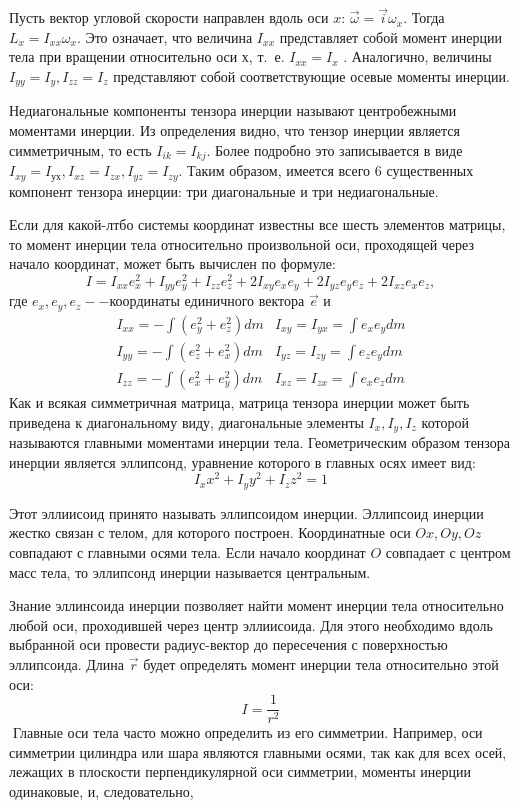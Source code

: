 \documentclass[12pt,a5paper,fleqn]{article}
\begin{document}
Пусть вектор угловой скорости направлен вдоль оси $x$: $\vec{\omega} = \vec{i} \omega_x$. Тогда $L_x = I_{xx}\omega_x$. Это означает, что величина $I_{xx}$ представляет собой момент инерции тела
при вращении относительно оси $х$, т.~е. $I_{xx} = I_x$ . Аналогично, величины
$I_{yy}= I_y,  I_{zz} = I_z$ представляют собой соответствующие осевые моменты
инерции.

Недиагональные компоненты тензора инерции называют центробежными моментами инерции.
Из определения видно, что тензор инерции является симметричным,
то есть $I_{ik} = I_{kj}$. Более подробно это записывается в виде
$I_{xy} = I_{ух},  I_{xz} = I_{zx}, I_{yz} = I_{zy}$.
Таким образом, имеется всего $6$ существенных компонент тензора инерции: три диагональные и три недиагональные.

\newpage

Если для какой-лтбо системы координат известны все шесть элементов матрицы, то момент инерции тела относительно произвольной оси, проходящей через начало координат, может быть вычислен по формуле:
\[I = I_{xx}e_x^2+I_{yy}e_y^2+I_{zz}e_z^2+2I_{xy}e_xe_y+2I_{yz}e_ye_z+2I_{xz}e_xe_z,\] где $e_x, e_y,e_z -- $координаты единичного вектора $\vec{e}$ и
\begin{equation*}
\begin{matrix}
	I_{xx} = -\int (e_y^2 +e_z^2) dm & I_{xy} = 			I_{yx} = \int e_xe_ydm\\
	I_{yy} = -\int (e_z^2 +e_x^2) dm & I_{yz} = 			I_{zy} = \int e_ze_ydm\\
	I_{zz} = -\int (e_x^2 +e_y^2) dm & I_{xz} = 			I_{zx} = \int e_xe_zdm
	\end{matrix} 
\end{equation*}
	\hspace{0.5cm}Как и всякая симметричная матрица, матрица тензора инерции может быть приведена к диагональному
виду, диагональные элементы $I_x, I_y, I_z$ которой называются главными моментами инерции тела. Геометрическим образом тензора инерции является эллипсонд, уравнение которого в главных осях имеет вид:
\[I_x x^2 + I_y y^2+ I_z z^2 = 1\]

	Этот эллиисоид принято называть эллипсоидом инерции. Эллипсоид инерции жестко связан с телом, для которого построен. Координатные оси $Ox, Oy, Oz$ совпадают с главными осями тела. Если начало
координат $O$ совпадает с центром масс тела, то эллипсонд инерции называется центральным.

	Знание эллинсоида инерции позволяет найти момент инерции тела относительно любой оси, проходившей через центр эллиисоида. Для этого необходимо вдоль выбранной оси провести радиус-вектор  до пересечения с поверхностью эллипсоида. Длина $\vec{r}$ будет определять момент инерции тела относительно этой оси:
\[I = \dfrac{1}{r^2}\]

	Главные оси тела часто можно определить из
его симметрии. Например, оси симметрии цилиндра или шара являются главными осями, так как для всех осей, лежащих в плоскости перпендикулярной оси симметрии, моменты инерции одинаковые, и, следовательно,
\end{document}
